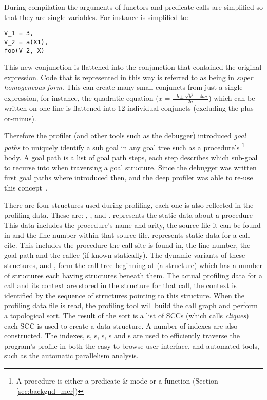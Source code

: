 During compilation the arguments of functors and predicate calls are
simplified so that they are single variables.
For instance  is simplified to:

\begin{verbatim}
V_1 = 3,
V_2 = a(X1),
foo(V_2, X)
\end{verbatim}

\noindent
This new conjunction is flattened into the conjunction that contained the
original expression.
Code that is represented in this way is referred to as being in \emph{super
homogeneous form}.
This can create many small conjuncts from just a single expression,
for instance, the quadratic equation
($x=\frac{-b \pm \sqrt {b^2-4ac}}{2a}$) which can be written on one line
is flattened into 12 individual conjuncts (excluding the plus-or-minus).

Therefore the profiler
(and other tools such as the debugger) introduced \emph{goal paths}
to uniquely identify a sub goal in any goal tree such as a procedure's%
\footnote{
A procedure is either a predicate \& mode or a function (Section
\ref{sec:backgnd_mer})}
body.
A goal path is a list of goal path steps, each step describes which
sub-goal to recurse into when traversing a goal structure.
Since the debugger was written first goal paths where introduced then,
and the deep profiler was able to re-use this concept~\cite{mdb}.

There are four structures used during profiling,
each one is also reflected in the profiling data.
These are: {\PS}, {\PD}, {\CSS} and {\CSD}.
{\PS} represents the static data about a procedure
This data includes the procedure's name and arity,
the source file it can be found in and the line number within that source file.
\CSS represents static data for a call cite.
This includes the procedure the call site is found in, the line number,
the goal path and the callee (if known statically).
The dynamic variants of these structures, \PD and {\CSD},
form the call tree beginning at  (a \PD structure)
which has a number of \CSD structures each having \PD structures
beneath them.
The actual profiling data for a call and its context are stored in
the \CSD structure for that call,
the context is identified by the sequence of structures pointing to this
structure.
When the profiling data file is read,
the profiling tool will build the call graph and perform a topological
sort.
The result of the sort is a list of SCCs
(which \citet{conway-deep} calls \emph{cliques})
each SCC is used to create a \Clique data structure.
A number of indexes are also constructed.
The indexes, {\Clique}s, {\PS}s, {\PD}s, {\CSS}s and {\CSD}s are used to
efficiently traverse the program's profile in both
the easy to browse user interface,
and automated tools, such as the automatic parallelism analysis.

